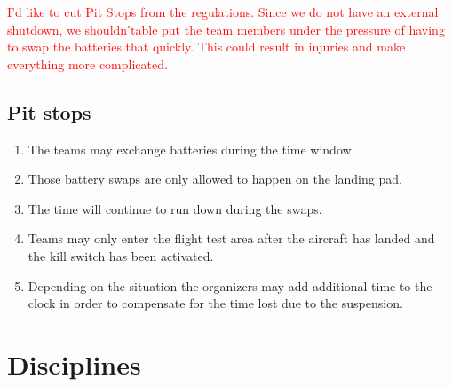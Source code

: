     \textcolor{red}{I'd like to cut Pit Stops from the regulations. Since we do not have an external shutdown, we shouldn'table
    put the team members under the pressure of having to swap the batteries that quickly. This could result in injuries and make everything more complicated.} 
    \subsection{Pit stops}
    \begin{enumerate}
      \item The teams may exchange batteries during the time window. 
      \item Those battery swaps are only allowed to happen on the landing pad. 
      \item The time will continue to run down during the swaps. 
      \item Teams may only enter the flight test area after the aircraft has landed and the kill switch has been activated.  
      \item Depending on the situation the organizers may add additional time to the clock in order to compensate for the time lost due to the suspension. 
    \end{enumerate}



    \section{Disciplines}
